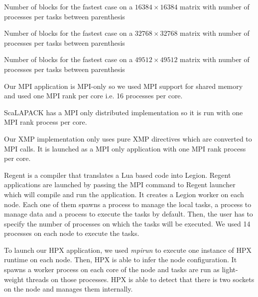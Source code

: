 \begin{table}[h]
	\centering
	\caption{Number of blocks for the fastest case on a $16384 \times 16384$ matrix with number of processes per tasks between parenthesis\label{tab:blocks}}
	
\end{table}

\begin{table}[h]
	\centering
	\caption{Number of blocks for the fastest case on a $32768 \times 32768$ matrix with number of processes per tasks between parenthesis\label{tab:blocks_32k}}
	
\end{table}

\begin{table}[h]
	\centering
	\caption{Number of blocks for the fastest case on a $49512 \times 49512$ matrix with number of processes per tasks between parenthesis\label{tab:blocks_49k}}
	
\end{table}

Our MPI application is MPI-only so we used MPI support for shared memory and used one MPI rank per core i.e. 16 processes per core.

ScaLAPACK has a MPI only distributed implementation so it is run with one MPI rank process per core.

Our XMP implementation only uses pure XMP directives which are converted to MPI calls.
It is launched as a MPI only application with one MPI rank process per core.

Regent is a compiler that translates a Lua based code into Legion.
Regent applications are launched by passing the MPI command to Regent launcher which will compile and run the application.
It creates a Legion worker on each node.
Each one of them spawns a process to manage the local tasks, a process to manage data and a process to execute the tasks by default.
Then, the user has to specify the number of processes on which the tasks will be executed.
We used 14 processes on each node to execute the tasks.

To launch our HPX application, we used \textit{mpirun} to execute one instance of HPX runtime on each node.
Then, HPX is able to infer the node configuration.
It spawns a worker process on each core of the node and tasks are run as light-weight threads on those processes.
HPX is able to detect that there is two sockets on the node and manages them internally.

